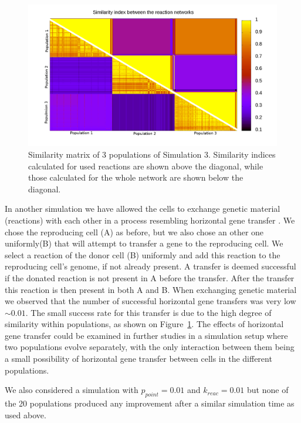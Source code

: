 \documentclass[a4paper,12pt]{article}
\begin{document}
\begin{figure}[htpb]
	\centering
	\includegraphics[width=1\linewidth]{simmatrix_sim3.png}
	\caption{Similarity matrix of 3 populations of Simulation 3. Similarity indices calculated for used reactions are shown above the diagonal, while those calculated for the whole network are shown below the diagonal.}
	\label{fig:simmatrix_sim3}
\end{figure}


In another simulation we have allowed the cells to exchange genetic material (reactions) with each other in a process resembling horizontal gene transfer \cite{horizontalgenetransfer}. We chose the reproducing cell (A) as before, but we also chose an other one uniformly(B) that will attempt to transfer a gene to the reproducing cell. We select a reaction of the donor cell (B) uniformly and add this reaction to the reproducing cell's genome, if not already present. A transfer is deemed successful if the donated reaction is not present in A before the transfer. After the transfer this reaction is then present in both A and B. When exchanging genetic material we observed that the number of successful horizontal gene transfers was very low $\sim 0.01$. The small success rate for this transfer is due to the high degree of similarity within populations, as shown on Figure~\ref{fig:simmatrix_sim3}. The effects of horizontal gene transfer could be examined in further studies in a simulation setup where two populations evolve separately, with the only interaction between them being a small possibility of horizontal gene transfer between cells in the different populations. %

We also considered a simulation with $p_{point}=0.01$ and $k_{reac}=0.01$ but none of the 20 populations produced any improvement after a similar simulation time as used above. 
\end{document}
